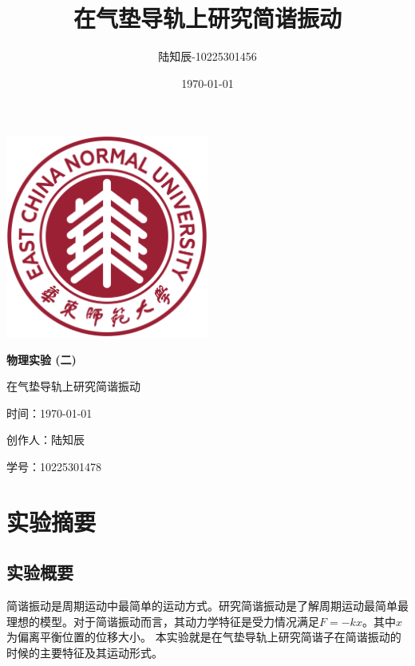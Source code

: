 \documentclass{ctexart}
\title{在气垫导轨上研究简谐振动}
\author{陆知辰-10225301456}
\date{\today}
\begin{document}
\begin{titlepage}
  \centering
  \includegraphics[width=0.5\textwidth]{ecnu.png}
  
  \vspace*{\baselineskip}
  
  \Huge\textbf{物\quad 理\quad 实\quad 验 \quad (二)}
  \vspace*{0.3\baselineskip}
  
  \huge 在气垫导轨上研究简谐振动
  
  \vspace*{2\baselineskip}
  
  \large 时间：\today
  
  \vspace*{\baselineskip}
  
  \large 创作人：陆知辰
  
  \vspace*{\baselineskip}
  
  \large 学号：10225301478
  
\end{titlepage}
\newpage
\tableofcontents
\newpage
\section{实验摘要}
  \subsection{实验概要}
  简谐振动是周期运动中最简单的运动方式。研究简谐振动是了解周期运动最简单最理想的模型。对于简谐振动而言，其动力学特征是受力情况满足$F=-kx$。其中$x$为偏离平衡位置的位移大小。
  本实验就是在气垫导轨上研究简谐子在简谐振动的时候的主要特征及其运动形式。
\end{document}

